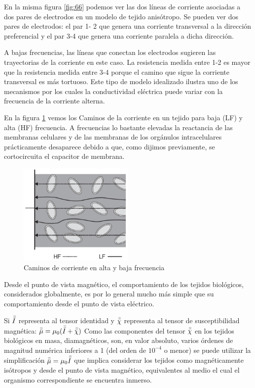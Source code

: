 En la misma figura \ref{fig:66} podemos ver las dos líneas de corriente asociadas a dos pares de
electrodos en un modelo de tejido anisótropo. Se pueden ver dos pares de electrodos: el par 1-
2 que genera una corriente transversal a la dirección preferencial y el par 3-4 que genera una corriente paralela a dicha dirección.

A bajas frecuencias, las líneas que conectan los electrodos sugieren las trayectorias de la
corriente en este caso. La resistencia medida entre 1-2 es mayor que la resistencia medida entre
3-4 porque el camino que sigue la corriente transversal es más tortuoso. Este tipo de modelo
idealizado ilustra uno de los mecanismos por los cuales la conductividad eléctrica puede variar
con la frecuencia de la corriente alterna.

En la figura \ref{fig:67} vemos los Caminos de la corriente en un tejido para baja (LF) y alta (HF) frecuencia. A frecuencias lo bastante elevadas la reactancia de las membranas celulares y de las membranas de los orgánulos intracelulares prácticamente desaparece debido a que, como dijimos previamente, se cortocircuita el capacitor de membrana.

\begin{figure}[H]
    \centering
    \includegraphics[width=0.5\textwidth]{./Figures/fig67}
	\caption{Caminos de corriente en alta y baja frecuencia}
	\label{fig:67}
\end{figure}

Desde el punto de vista magnético, el comportamiento de los tejidos biológicos, considerados globalmente, es por lo general mucho más simple que su comportamiento desde el punto de vista eléctrico.

Si $\bar{\bar{I}}$ representa al tensor identidad y $\bar{\bar{\chi}}$ representa al tensor de susceptibilidad magnética: $\bar{\bar{\mu}}=\mu_{0}(\bar{\bar{I}}+\bar{\bar{\chi}})$
Como las componentes del tensor $\bar{\bar{\chi}}$ en los tejidos biológicos en masa, diamagnéticos, son, en valor absoluto, varios órdenes de magnitud numérica inferiores a 1 (del orden de $10^{-4}$ o menor) se puede utilizar la simplificación $\bar{\bar{\mu}}=\mu_{0}\bar{\bar{I}}$ que implica considerar los tejidos como magnéticamente isótropos y desde el punto de vista magnético, equivalentes al medio el cual el organismo correspondiente se encuentra inmerso.

